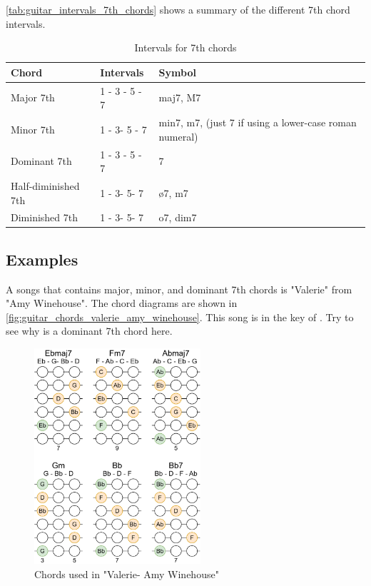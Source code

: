 \autoref{tab:guitar_intervals_7th_chords} shows a summary of the different 7th chord intervals.

\begin{table}[h]
	\centering
	\begin{NiceTabular}{|l|l|l|}
		\hline
		\textbf{Chord} & \textbf{Intervals} & \textbf{Symbol} \\
		\hline
		\hline
		Major 7th & 1 - 3 - 5 - 7 & maj7, M7 \\
		\hline
		Minor 7th & 1 - 3\flat - 5 - 7\flat & min7, m7, (just 7 if using a lower-case roman numeral) \\
		\hline
		Dominant 7th & 1 - 3 - 5 - 7\flat & 7 \\
		\hline
		Half-diminished 7th & 1 - 3\flat - 5\flat - 7\flat & \o7, m7 \\
		\hline
		Diminished 7th & 1 - 3\flat - 5\flat - 7\flatflat & o7, dim7 \\
		\hline
	\end{NiceTabular}
	\caption{Intervals for 7th chords}
	\label{tab:guitar_intervals_7th_chords}
\end{table}


\newpage

\subsection{Examples}


A songs that contains major, minor, and dominant 7th chords is "Valerie" from "Amy Winehouse". The chord diagrams are shown in \autoref{fig:guitar_chords_valerie_amy_winehouse}. This song is in the key of . Try to see why  is a dominant 7th chord here.

\begin{figure}[h]
	\centering
	\includegraphics[width=0.55\textwidth]{../../Images/ChordsInValerieAmyWinehouse.png}
	\caption{Chords used in "Valerie- Amy Winehouse"}
	\label{fig:guitar_chords_valerie_amy_winehouse}
\end{figure}


